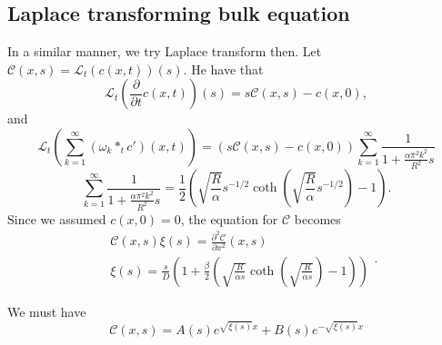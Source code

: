 \documentclass[]{article}
\newcommand{\pderiv}[2]{\frac{\partial #1}{\partial #2}}
\begin{document}
\subsection{Laplace transforming bulk equation}
In a similar manner, we try Laplace transform then. Let $\mathcal{C}(x,s) = \mathcal{L}_t(c(x,t))(s)$. 
He have that
\begin{equation}
\mathcal{L}_t\left(\pderiv{}{t}c(x,t) \right)(s) = s \mathcal{C}(x,s) - c(x,0),
\end{equation}
and
\begin{equation}
\mathcal{L}_t\left(\sum_{k=1}^\infty (\omega_k *_t c')(x,t)\right) = (s \mathcal{C}(x,s) - c(x,0)) \sum_{k=1}^\infty \frac{1}{1 + \frac{\alpha \pi^2 k^2}{R^2} s}
\end{equation}
\begin{equation}
\sum_{k=1}^\infty \frac{1}{1 + \frac{\alpha \pi^2 k^2}{R^2} s} = \frac{1}{2}\left(\sqrt{\frac{R}{\alpha}} s^{-1/2} \coth \left(\sqrt{\frac{R}{\alpha}} s^{-1/2}\right) - 1 \right).
\end{equation}
Since we assumed $c(x,0) = 0$, the equation for $\mathcal{C}$ becomes
\begin{equation}
\begin{split}
& \mathcal{C}(x,s) \xi(s) = \frac{\partial^2 \mathcal{C}}{\partial x^2}(x,s) \\
& \xi(s) = \frac{s}{D} \left(1 + \frac{\beta}{2} \left(\sqrt{\frac{R}{\alpha s}} \coth \left(\sqrt{\frac{R}{\alpha s}} \right) - 1 \right) \right)
\end{split}.
\end{equation}

We must have
\begin{equation}
\mathcal{C}(x,s) = A(s) e^{\sqrt{\xi(s)} x} + B(s) e^{-\sqrt{\xi(s)} x}
\end{equation}
\end{document}
